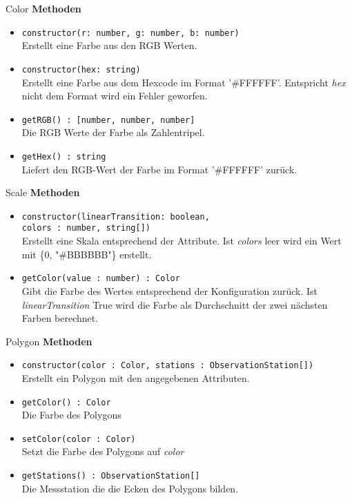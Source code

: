     \begin{Class}{Color}
        \textbf{Methoden}
        \begin{itemize}
            \item \texttt{constructor(r: number, g: number, b: number)}
            \\ Erstellt eine Farbe aus den RGB Werten.
            \item \texttt{constructor(hex: string)}
            \\ Erstellt eine Farbe aus dem Hexcode im Format '\#FFFFFF'.
            Entspricht \emph{hex} nicht dem Format wird ein Fehler geworfen.
            \item \texttt{getRGB() : [number, number, number]}
            \\ Die RGB Werte der Farbe als Zahlentripel.
            \item \texttt{getHex() : string}
            \\ Liefert den RGB-Wert der Farbe im Format '\#FFFFFF' zurück.
        \end{itemize}
    \end{Class}

    \begin{Class}{Scale}
        \textbf{Methoden}
        \begin{itemize}
            \item \texttt{constructor(linearTransition: boolean,
            \\colors : {number, string}[])}
            \\ Erstellt eine Skala entsprechend der Attribute.
            Ist \emph{colors} leer wird ein Wert mit \{0, "\#BBBBBB"\} erstellt.
            \item \texttt{getColor(value : number) : Color}
            \\ Gibt die Farbe des Wertes entsprechend der Konfiguration zurück.
            Ist \emph{linearTransition} True wird die Farbe als Durchschnitt der zwei nächsten Farben berechnet.
        \end{itemize}
    \end{Class}

    \begin{Class}{Polygon}
        \textbf{Methoden}
        \begin{itemize}
            \item \texttt{constructor(color : Color, stations : ObservationStation[])}
            \\ Erstellt ein Polygon mit den angegebenen Attributen.
            \item \texttt{getColor() : Color}
            \\ Die Farbe des Polygons
            \item \texttt{setColor(color : Color)}
            \\ Setzt die Farbe des Polygons auf \emph{color}
            \item \texttt{getStations() : ObservationStation[]}
            \\ Die Messstation die die Ecken des Polygons bilden.
        \end{itemize}
    \end{Class}

